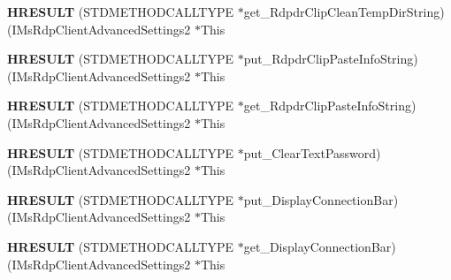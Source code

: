 \begin{DoxyCompactItemize}
\item 
\mbox{\label{struct_i_ms_rdp_client_advanced_settings2_vtbl_ab4e4476fd1cd60beb4ac5e035fdf2f19}} 
{\bfseries H\+R\+E\+S\+U\+LT} (S\+T\+D\+M\+E\+T\+H\+O\+D\+C\+A\+L\+L\+T\+Y\+PE $\ast$get\+\_\+\+Rdpdr\+Clip\+Clean\+Temp\+Dir\+String)(I\+Ms\+Rdp\+Client\+Advanced\+Settings2 $\ast$This
\item 
\mbox{\label{struct_i_ms_rdp_client_advanced_settings2_vtbl_aa0659e34cc3838d65916361d5a5acb8e}} 
{\bfseries H\+R\+E\+S\+U\+LT} (S\+T\+D\+M\+E\+T\+H\+O\+D\+C\+A\+L\+L\+T\+Y\+PE $\ast$put\+\_\+\+Rdpdr\+Clip\+Paste\+Info\+String)(I\+Ms\+Rdp\+Client\+Advanced\+Settings2 $\ast$This
\item 
\mbox{\label{struct_i_ms_rdp_client_advanced_settings2_vtbl_a256fde40b4b8ff6ae25f6640686b39be}} 
{\bfseries H\+R\+E\+S\+U\+LT} (S\+T\+D\+M\+E\+T\+H\+O\+D\+C\+A\+L\+L\+T\+Y\+PE $\ast$get\+\_\+\+Rdpdr\+Clip\+Paste\+Info\+String)(I\+Ms\+Rdp\+Client\+Advanced\+Settings2 $\ast$This
\item 
\mbox{\label{struct_i_ms_rdp_client_advanced_settings2_vtbl_a5d675dcdd31559cf48a3a83787ff6e80}} 
{\bfseries H\+R\+E\+S\+U\+LT} (S\+T\+D\+M\+E\+T\+H\+O\+D\+C\+A\+L\+L\+T\+Y\+PE $\ast$put\+\_\+\+Clear\+Text\+Password)(I\+Ms\+Rdp\+Client\+Advanced\+Settings2 $\ast$This
\item 
\mbox{\label{struct_i_ms_rdp_client_advanced_settings2_vtbl_a94c2ab24cd229106e332700a479e312c}} 
{\bfseries H\+R\+E\+S\+U\+LT} (S\+T\+D\+M\+E\+T\+H\+O\+D\+C\+A\+L\+L\+T\+Y\+PE $\ast$put\+\_\+\+Display\+Connection\+Bar)(I\+Ms\+Rdp\+Client\+Advanced\+Settings2 $\ast$This
\item 
\mbox{\label{struct_i_ms_rdp_client_advanced_settings2_vtbl_a31f4163c01247afa20abf6b46e9df2f1}} 
{\bfseries H\+R\+E\+S\+U\+LT} (S\+T\+D\+M\+E\+T\+H\+O\+D\+C\+A\+L\+L\+T\+Y\+PE $\ast$get\+\_\+\+Display\+Connection\+Bar)(I\+Ms\+Rdp\+Client\+Advanced\+Settings2 $\ast$This
\item 
\mbox{\label{struct_i_ms_rdp_client_advanced_settings2_vtbl_a06aa57357a5ec909b7a1c2c3cc0bb63a}} 

\end{DoxyCompactItemize}
